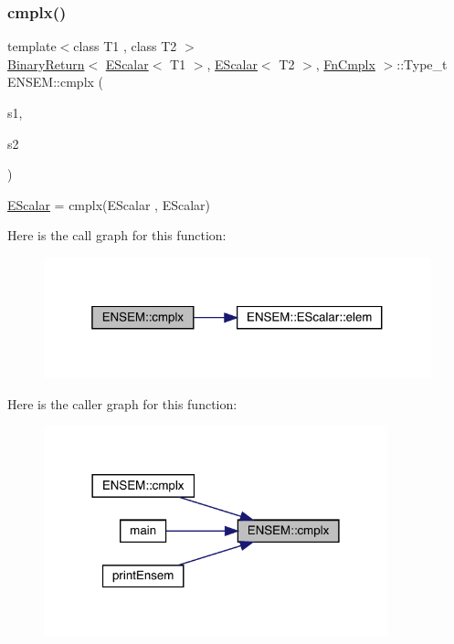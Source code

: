 \subsubsection{\texorpdfstring{cmplx()}{cmplx()}}
{\footnotesize\ttfamily template$<$class T1 , class T2 $>$ \\
\mbox{\hyperlink{structENSEM_1_1BinaryReturn}{Binary\+Return}}$<$ \mbox{\hyperlink{classENSEM_1_1EScalar}{E\+Scalar}}$<$ T1 $>$, \mbox{\hyperlink{classENSEM_1_1EScalar}{E\+Scalar}}$<$ T2 $>$, \mbox{\hyperlink{structENSEM_1_1FnCmplx}{Fn\+Cmplx}} $>$\+::Type\+\_\+t E\+N\+S\+E\+M\+::cmplx (\begin{DoxyParamCaption}\item[{const \mbox{\hyperlink{classENSEM_1_1EScalar}{E\+Scalar}}$<$ T1 $>$ \&}]{s1,  }\item[{const \mbox{\hyperlink{classENSEM_1_1EScalar}{E\+Scalar}}$<$ T2 $>$ \&}]{s2 }\end{DoxyParamCaption})\hspace{0.3cm}{\ttfamily [inline]}}



\mbox{\hyperlink{classENSEM_1_1EScalar}{E\+Scalar}} = cmplx(\+E\+Scalar , E\+Scalar) 

Here is the call graph for this function\+:\nopagebreak
\begin{figure}[H]
\begin{center}
\leavevmode
\includegraphics[width=319pt]{d4/dca/group__escalar_gaccbb7d66b912e8f0972f4e50095f296e_cgraph}
\end{center}
\end{figure}
Here is the caller graph for this function\+:
\nopagebreak
\begin{figure}[H]
\begin{center}
\leavevmode
\includegraphics[width=282pt]{d4/dca/group__escalar_gaccbb7d66b912e8f0972f4e50095f296e_icgraph}
\end{center}
\end{figure}
\mbox{\label{group__escalar_ga291c7e9b7f872b3e6db0d75ff3421b6a}} 
